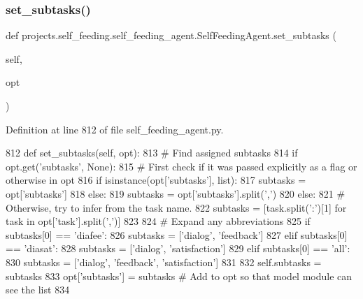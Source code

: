 \subsubsection{\texorpdfstring{set\+\_\+subtasks()}{set\_subtasks()}}
{\footnotesize\ttfamily def projects.\+self\+\_\+feeding.\+self\+\_\+feeding\+\_\+agent.\+Self\+Feeding\+Agent.\+set\+\_\+subtasks (\begin{DoxyParamCaption}\item[{}]{self,  }\item[{}]{opt }\end{DoxyParamCaption})}



Definition at line 812 of file self\+\_\+feeding\+\_\+agent.\+py.


\begin{DoxyCode}
812     \textcolor{keyword}{def }set\_subtasks(self, opt):
813         \textcolor{comment}{# Find assigned subtasks}
814         \textcolor{keywordflow}{if} opt.get(\textcolor{stringliteral}{'subtasks'}, \textcolor{keywordtype}{None}):
815             \textcolor{comment}{# First check if it was passed explicitly as a flag or otherwise in opt}
816             \textcolor{keywordflow}{if} isinstance(opt[\textcolor{stringliteral}{'subtasks'}], list):
817                 subtasks = opt[\textcolor{stringliteral}{'subtasks'}]
818             \textcolor{keywordflow}{else}:
819                 subtasks = opt[\textcolor{stringliteral}{'subtasks'}].split(\textcolor{stringliteral}{','})
820         \textcolor{keywordflow}{else}:
821             \textcolor{comment}{# Otherwise, try to infer from the task name.}
822             subtasks = [task.split(\textcolor{stringliteral}{':'})[1] \textcolor{keywordflow}{for} task \textcolor{keywordflow}{in} opt[\textcolor{stringliteral}{'task'}].split(\textcolor{stringliteral}{','})]
823 
824         \textcolor{comment}{# Expand any abbreviations}
825         \textcolor{keywordflow}{if} subtasks[0] == \textcolor{stringliteral}{'diafee'}:
826             subtasks = [\textcolor{stringliteral}{'dialog'}, \textcolor{stringliteral}{'feedback'}]
827         \textcolor{keywordflow}{elif} subtasks[0] == \textcolor{stringliteral}{'diasat'}:
828             subtasks = [\textcolor{stringliteral}{'dialog'}, \textcolor{stringliteral}{'satisfaction'}]
829         \textcolor{keywordflow}{elif} subtasks[0] == \textcolor{stringliteral}{'all'}:
830             subtasks = [\textcolor{stringliteral}{'dialog'}, \textcolor{stringliteral}{'feedback'}, \textcolor{stringliteral}{'satisfaction'}]
831 
832         self.subtasks = subtasks
833         opt[\textcolor{stringliteral}{'subtasks'}] = subtasks  \textcolor{comment}{# Add to opt so that model module can see the list}
834 
\end{DoxyCode}
